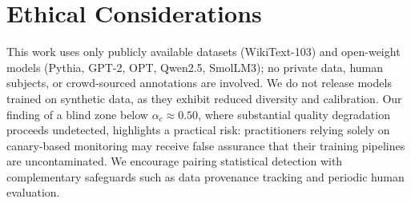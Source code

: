 \section*{Ethical Considerations}

This work uses only publicly available datasets (WikiText-103) and open-weight models (Pythia, GPT-2, OPT, Qwen2.5, SmolLM3); no private data, human subjects, or crowd-sourced annotations are involved.
We do not release models trained on synthetic data, as they exhibit reduced diversity and calibration.
Our finding of a blind zone below $\alpha_c \approx 0.50$, where substantial quality degradation proceeds undetected, highlights a practical risk: practitioners relying solely on canary-based monitoring may receive false assurance that their training pipelines are uncontaminated.
We encourage pairing statistical detection with complementary safeguards such as data provenance tracking and periodic human evaluation.
